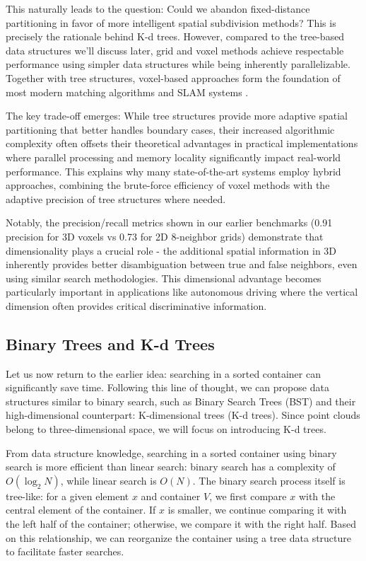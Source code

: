 This naturally leads to the question: Could we abandon fixed-distance partitioning in favor of more intelligent spatial subdivision methods? This is precisely the rationale behind K-d trees. However, compared to the tree-based data structures we'll discuss later, grid and voxel methods achieve respectable performance using simpler data structures while being inherently parallelizable. Together with tree structures, voxel-based approaches form the foundation of most modern matching algorithms and SLAM systems \cite{Koide2019,Koide2020,Huang2021a,Bai2022}. 

The key trade-off emerges: While tree structures provide more adaptive spatial partitioning that better handles boundary cases, their increased algorithmic complexity often offsets their theoretical advantages in practical implementations where parallel processing and memory locality significantly impact real-world performance. This explains why many state-of-the-art systems employ hybrid approaches, combining the brute-force efficiency of voxel methods with the adaptive precision of tree structures where needed.

Notably, the precision/recall metrics shown in our earlier benchmarks (0.91 precision for 3D voxels vs 0.73 for 2D 8-neighbor grids) demonstrate that dimensionality plays a crucial role - the additional spatial information in 3D inherently provides better disambiguation between true and false neighbors, even using similar search methodologies. This dimensional advantage becomes particularly important in applications like autonomous driving where the vertical dimension often provides critical discriminative information.

\subsection{Binary Trees and K-d Trees}
\label{sec:binary-tree}
Let us now return to the earlier idea: searching in a sorted container can significantly save time. Following this line of thought, we can propose data structures similar to binary search, such as Binary Search Trees (BST) and their high-dimensional counterpart: K-dimensional trees (K-d trees). Since point clouds belong to three-dimensional space, we will focus on introducing K-d trees.  

From data structure knowledge, searching in a sorted container using binary search is more efficient than linear search: binary search has a complexity of \(O(\log_2 N)\), while linear search is \(O(N)\). The binary search process itself is tree-like: for a given element \(x\) and container \(V\), we first compare \(x\) with the central element of the container. If \(x\) is smaller, we continue comparing it with the left half of the container; otherwise, we compare it with the right half. Based on this relationship, we can reorganize the container using a tree data structure to facilitate faster searches.  

